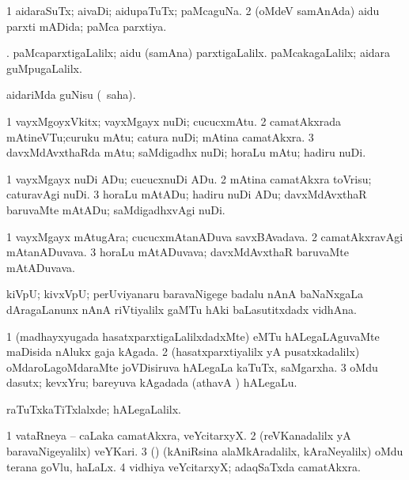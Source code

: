 \bentry
{}
\gl{\gu}
\bmng
\bnum
\num{1} aidaraSuTx; aivaDi; aidupaTuTx; paMcaguNa. 
\num{2} (oMdeV samAnAda) aidu parxti mADida; paMca parxtiya. 
\enum
\emng

\noindent
\gl{\pagu}
\expl{}
\bmng
{}. 
\banum
{} paMcaparxtigaLalilx; aidu (samAna) parxtigaLalilx. 
 paMcakagaLalilx; aidara guMpugaLalilx. 
\eanum
\emng
\eentry

\bentry
{}
\gl{\sakirx}
\expl{}
\bmng
aidariMda guNisu (\akirx\ saha). 
\emng
\eentry

\bentry
{}
\gl{\nA }
\bmng
\bnum
\num{1} vayxMgoyxVkitx; vayxMgayx nuDi; cucucxmAtu. 
\num{2} camatAkxrada mAtineVTu;curuku mAtu; catura nuDi; mAtina camatAkxra. 
\num{3} davxMdAvxthaRda mAtu; saMdigadhx nuDi; horaLu mAtu; hadiru nuDi. 
\enum
\emng
\eentry

\bentry
{}
\gl{\akirx}
\bmng
\bnum
\num{1} vayxMgayx nuDi ADu; cucucxnuDi ADu. 
\num{2} mAtina camatAkxra toVrisu; caturavAgi nuDi. 
\num{3} horaLu mAtADu; hadiru nuDi ADu; davxMdAvxthaR baruvaMte mAtADu; saMdigadhxvAgi nuDi. 
\enum
\emng
\eentry

\bentry
{}
\gl{\nA}
\bmng
\bnum
\num{1} vayxMgayx mAtugAra; cucucxmAtanADuva savxBAvadava. 
\num{2} camatAkxravAgi mAtanADuvava. 
\num{3} horaLu mAtADuvava; davxMdAvxthaR baruvaMte mAtADuvava. 
\enum
\emng
\eentry

\bentry
{}
\gl{\nA}
\bmng
kiVpU; kivxVpU; perUviyanaru baravaNigege badalu nAnA baNaNxgaLa dAragaLanunx nAnA riVtiyalilx gaMTu hAki baLasutitxdadx vidhAna. 
\emng
\eentry

\bentry
{}
\gl{\nA}
\bmng
\bnum
\num{1} (madhayxyugada hasatxparxtigaLalilxdadxMte) eMTu hALegaLAguvaMte maDisida nAlukx gaja kAgada. 
\num{2} (hasatxparxtiyalilx yA pusatxkadalilx) oMdaroLagoMdaraMte joVDisiruva hALegaLa kaTuTx, saMgarxha. 
\num{3} oMdu dasutx; kevxYru; bareyuva kAgadada  (athavA ) hALegaLu. 
\enum
\emng

\noindent
\gl{\pagu}
\bmng
{} raTuTxkaTiTxlalxde; hALegaLalilx. 
\emng
\eentry

\bentry
{}
\gl{\nA}
\bmng
\bnum
\num{1} vataRneya -- caLaka camatAkxra, veYcitarxyX. 
\num{2} (reVKanadalilx yA baravaNigeyalilx) veYKari. 
\num{3} (\vAshi) (kAniRsina alaMkAradalilx, kAraNeyalilx) oMdu terana goVlu, haLaLx. 
\num{4} vidhiya veYcitarxyX; adaqSaTxda camatAkxra. 
\enum
\emng
\eentry


